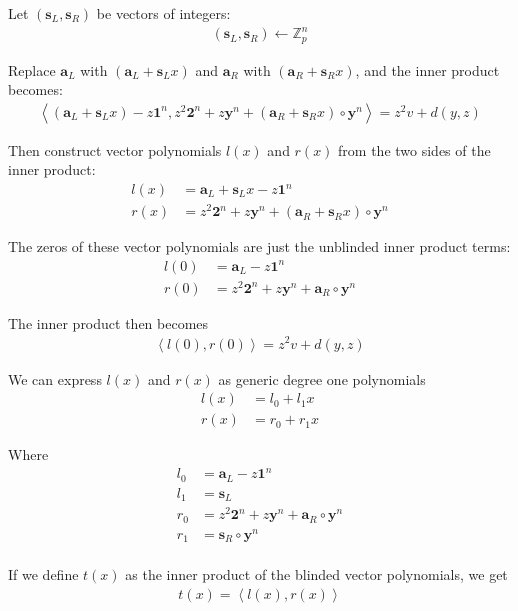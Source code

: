 \documentclass{article}
\begin{document}
Let $(\textbf{s}_L, \textbf{s}_R)$ be vectors of integers:
\begin{align}
  (\textbf{s}_L, \textbf{s}_R) \leftarrow \mathbb{Z}_p^n
\end{align}

Replace $\textbf{a}_L$ with $(\textbf{a}_L + \textbf{s}_L x)$ and $\textbf{a}_R$ with $(\textbf{a}_R + \textbf{s}_R x)$, and the inner product becomes:
\begin{align}
  \left<(\textbf{a}_L + \textbf{s}_L x) - z \textbf{1}^n, z^2 \textbf{2}^n + z \textbf{y}^n + (\textbf{a}_R + \textbf{s}_R x)\circ\textbf{y}^n\right> = z^2 v + d(y,z)
\end{align}

Then construct vector polynomials $l(x)$ and $r(x)$ from the two sides of the inner product:
\begin{align}
  l(x) &= \textbf{a}_L + \textbf{s}_L x - z \textbf{1}^n\\
  r(x) &= z^2 \textbf{2}^n + z \textbf{y}^n + (\textbf{a}_R+ \textbf{s}_R x)\circ\textbf{y}^n
\end{align}

The zeros of these vector polynomials are just the unblinded inner product terms:
\begin{align}
  l(0) &= \textbf{a}_L - z \textbf{1}^n\\
  r(0) &= z^2 \textbf{2}^n + z \textbf{y}^n + \textbf{a}_R\circ\textbf{y}^n
\end{align}

The inner product then becomes
\begin{align}
  \left<l(0), r(0)\right> = z^2 v + d(y,z)
\end{align}

We can express $l(x)$ and $r(x)$ as generic degree one polynomials
\begin{align}
  l(x) &= l_0 + l_1 x\\
  r(x) &= r_0 + r_1 x
\end{align}

Where
\begin{align}
  l_0 &= \textbf{a}_L - z \textbf{1}^n\\
  l_1 &= \textbf{s}_L\\
  r_0 &= z^2 \textbf{2}^n + z \textbf{y}^n + \textbf{a}_R\circ\textbf{y}^n\\
  r_1 &= \textbf{s}_R\circ\textbf{y}^n\\
\end{align}

If we define $t(x)$ as the inner product of the blinded vector polynomials, we get
\begin{align}
  t(x) = \left<l(x), r(x)\right> 
\end{align}
\end{document}

